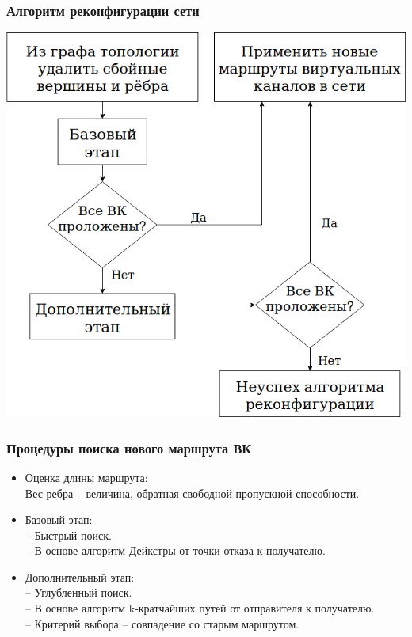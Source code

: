 \documentclass[14pt, handout]{beamer}
\begin{document}
\begin{frame}
\frametitle{Алгоритм реконфигурации сети}
\begin{center}
\includegraphics[height=0.85\textheight]{img/alg.png}
\end{center}
\end{frame}


\begin{frame}
\frametitle{Процедуры поиска нового маршрута ВК}
\begin{itemize}
	\item Оценка длины маршрута: \\
		 Вес ребра -- величина, обратная свободной пропускной способности.
	\item Базовый этап: \\
		-- Быстрый поиск. \\
		-- В основе алгоритм Дейкстры от точки отказа к получателю.
	\item Дополнительный этап: \\
		-- Углубленный поиск. \\
		-- В основе алгоритм k-кратчайших путей от отправителя к получателю. \\
		-- Критерий выбора -- совпадение со старым маршрутом.
\end{itemize}

\end{frame}
\end{document}
